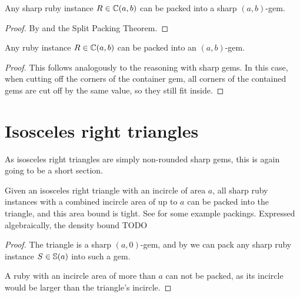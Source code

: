 \documentclass[a4paper,style=print,oneside,bibliography=totoc,nexus,lnum,extramargin]{tubsbook}
\begin{document}

\begin{theorem}\label{th:sharp-gem}
    Any sharp ruby instance $R \in \mathbb{C}(a,b)$ can be packed into a sharp $(a,b)$-gem.
\end{theorem}

\begin{proof}
    By  and the Split Packing Theorem.
\end{proof}

\begin{theorem}\label{th:gem}
    Any ruby instance $R \in \mathbb{C}(a,b)$ can be packed into an $(a,b)$-gem.
\end{theorem}

\begin{proof}
    This follows analogously to the reasoning with sharp gems. In this case, when cutting off the corners of the container gem, all corners of the contained gems are cut off by the same value, so they still fit inside.
\end{proof}

\section{Isosceles right triangles}

As isosceles right triangles are simply non-rounded sharp gems, this is again going to be a short section.

\begin{theorem}\label{th:iso-right}
    Given an isosceles right triangle with an incircle of area $a$, all sharp ruby instances with a combined incircle area of up to $a$ can be packed into the triangle, and this area bound is tight.
    See  for some example packings.
    Expressed algebraically, the density bound TODO
\end{theorem}

\begin{proof}
    The triangle is a sharp $(a,0)$-gem, and by  we can pack any sharp ruby instance $S \in \mathbb{S}(a)$ into such a gem.

    A ruby with an incircle area of more than $a$ can not be packed, as its incircle would be larger than the triangle's incircle.
\end{proof}
\end{document}
